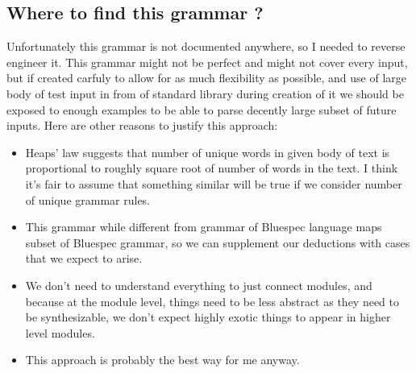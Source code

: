 \documentclass[14pt]{report}
\begin{document}
\subsection{Where to find this grammar ?}
Unfortunately this grammar is not documented anywhere, so I needed to reverse engineer it. This grammar might not be perfect and might not cover every input, but if created carfuly to allow for as much flexibility as possible, and use of large body of test input in from of standard library during creation of it we should be exposed to enough examples to be able to parse decently large subset of future inputs.
Here are other reasons to justify this approach:
\begin{itemize}
    \item Heaps' law suggests that number of unique words in given body of text is proportional to roughly square root of number of words in the text. I think it's fair to assume that something similar will be true if we consider number of unique grammar rules.
    \item This grammar while different from grammar of Bluespec language maps subset of Bluespec grammar, so we can supplement our deductions with cases that we expect to arise.
    \item We don't need to understand everything to just connect modules, and because at the module level, things need to be less abstract as they need to be synthesizable, we don't expect highly exotic things to appear in higher level modules.
    \item This approach is probably the best way for me anyway.
\end{itemize}
\end{document}
